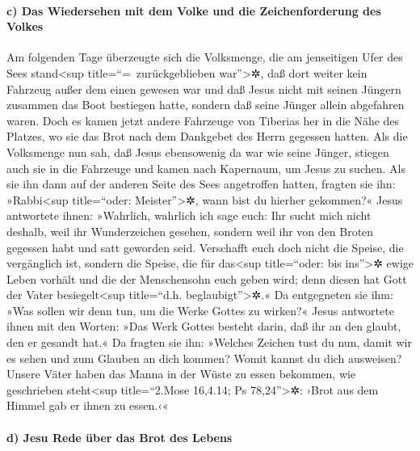 \hypertarget{c-das-wiedersehen-mit-dem-volke-und-die-zeichenforderung-des-volkes}{%
\paragraph{c) Das Wiedersehen mit dem Volke und die Zeichenforderung des
Volkes}\label{c-das-wiedersehen-mit-dem-volke-und-die-zeichenforderung-des-volkes}}

 Am folgenden Tage überzeugte sich die Volksmenge, die am
jenseitigen Ufer des Sees stand\textless sup title=``=~zurückgeblieben
war''\textgreater✲, daß dort weiter kein Fahrzeug außer dem einen
gewesen war und daß Jesus nicht mit seinen Jüngern zusammen das Boot
bestiegen hatte, sondern daß seine Jünger allein abgefahren waren.
 Doch es kamen jetzt andere Fahrzeuge von Tiberias her in
die Nähe des Platzes, wo sie das Brot nach dem Dankgebet des Herrn
gegessen hatten.  Als die Volksmenge nun sah, daß Jesus
ebensowenig da war wie seine Jünger, stiegen auch sie in die Fahrzeuge
und kamen nach Kapernaum, um Jesus zu suchen.  Als sie
ihn dann auf der anderen Seite des Sees angetroffen hatten, fragten sie
ihn: »Rabbi\textless sup title=``oder: Meister''\textgreater✲, wann bist
du hierher gekommen?«  Jesus antwortete ihnen: »Wahrlich,
wahrlich ich sage euch: Ihr sucht mich nicht deshalb, weil ihr
Wunderzeichen gesehen, sondern weil ihr von den Broten gegessen habt und
satt geworden seid.  Verschafft euch doch nicht die
Speise, die vergänglich ist, sondern die Speise, die für
das\textless sup title=``oder: bis ins''\textgreater✲ ewige Leben
vorhält und die der Menschensohn euch geben wird; denn diesen hat Gott
der Vater besiegelt\textless sup title=``d.h.
beglaubigt''\textgreater✲.«  Da entgegneten sie ihm: »Was
sollen wir denn tun, um die Werke Gottes zu wirken?« 
Jesus antwortete ihnen mit den Worten: »Das Werk Gottes besteht darin,
daß ihr an den glaubt, den er gesandt hat.«  Da fragten
sie ihn: »Welches Zeichen tust du nun, damit wir es sehen und zum
Glauben an dich kommen? Womit kannst du dich ausweisen? 
Unsere Väter haben das Manna in der Wüste zu essen bekommen, wie
geschrieben steht\textless sup title=``2.Mose 16,4.14; Ps
78,24''\textgreater✲: ›Brot aus dem Himmel gab er ihnen zu essen.‹«

\hypertarget{d-jesu-rede-uxfcber-das-brot-des-lebens}{%
\paragraph{d) Jesu Rede über das Brot des
Lebens}\label{d-jesu-rede-uxfcber-das-brot-des-lebens}}

